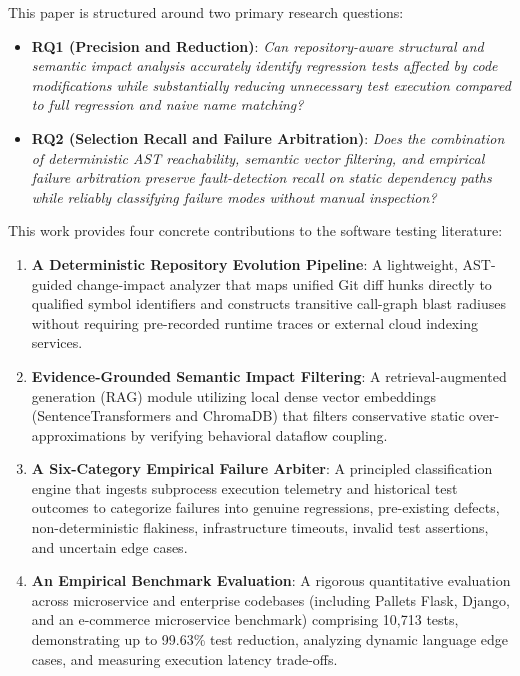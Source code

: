 \documentclass[12pt,onecolumn,draftclsnofoot]{IEEEtran}
\begin{document}
This paper is structured around two primary research questions:
\begin{itemize}
    \item \textbf{RQ1 (Precision and Reduction)}: \textit{Can repository-aware structural and semantic impact analysis accurately identify regression tests affected by code modifications while substantially reducing unnecessary test execution compared to full regression and naive name matching?}
    \item \textbf{RQ2 (Selection Recall and Failure Arbitration)}: \textit{Does the combination of deterministic AST reachability, semantic vector filtering, and empirical failure arbitration preserve fault-detection recall on static dependency paths while reliably classifying failure modes without manual inspection?}
\end{itemize}

This work provides four concrete contributions to the software testing literature:
\begin{enumerate}
    \item \textbf{A Deterministic Repository Evolution Pipeline}: A lightweight, AST-guided change-impact analyzer that maps unified Git diff hunks directly to qualified symbol identifiers and constructs transitive call-graph blast radiuses without requiring pre-recorded runtime traces or external cloud indexing services.
    \item \textbf{Evidence-Grounded Semantic Impact Filtering}: A retrieval-augmented generation (RAG) module utilizing local dense vector embeddings (SentenceTransformers and ChromaDB) that filters conservative static over-approximations by verifying behavioral dataflow coupling.
    \item \textbf{A Six-Category Empirical Failure Arbiter}: A principled classification engine that ingests subprocess execution telemetry and historical test outcomes to categorize failures into genuine regressions, pre-existing defects, non-deterministic flakiness, infrastructure timeouts, invalid test assertions, and uncertain edge cases.
    \item \textbf{An Empirical Benchmark Evaluation}: A rigorous quantitative evaluation across microservice and enterprise codebases (including Pallets Flask, Django, and an e-commerce microservice benchmark) comprising 10,713 tests, demonstrating up to 99.63\% test reduction, analyzing dynamic language edge cases, and measuring execution latency trade-offs.
\end{enumerate}
\end{document}
